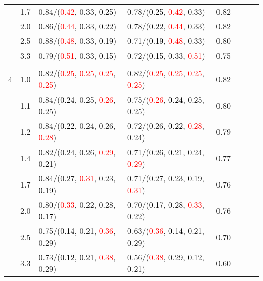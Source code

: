 \documentclass[10pt,a4paper]{report}
\begin{document}
\begin{table}[!htbp]
\begin{center}
{\begin{tabular}{ccllcccc}
			&1.7&0.84/(\textcolor{red}{0.42}, 0.33, \textcolor{black}{0.25})&0.78/(\textcolor{black}{0.25}, \textcolor{red}{0.42}, 0.33)&0.82\\
			&2.0&0.86/(\textcolor{red}{0.44}, 0.33, \textcolor{black}{0.22})&0.78/(\textcolor{black}{0.22}, \textcolor{red}{0.44}, 0.33)&0.82\\
			&2.5&0.88/(\textcolor{red}{0.48}, 0.33, \textcolor{black}{0.19})&0.71/(\textcolor{black}{0.19}, \textcolor{red}{0.48}, 0.33)&0.80\\
			&3.3&0.79/(\textcolor{red}{0.51}, 0.33, \textcolor{black}{0.15})&0.72/(\textcolor{black}{0.15}, 0.33, \textcolor{red}{0.51})&0.75\\
			&&&&\\
			4			&1.0&0.82/(\textcolor{red}{0.25}, \textcolor{red}{0.25}, \textcolor{red}{0.25}, \textcolor{red}{0.25})&0.82/(\textcolor{red}{0.25}, \textcolor{red}{0.25}, \textcolor{red}{0.25}, \textcolor{red}{0.25})&0.82\\
			&1.1&0.84/(\textcolor{black}{0.24}, 0.25, \textcolor{red}{0.26}, 0.25)&0.75/(\textcolor{red}{0.26}, \textcolor{black}{0.24}, 0.25, 0.25)&0.80\\
			&1.2&0.84/(\textcolor{black}{0.22}, 0.24, 0.26, \textcolor{red}{0.28})&0.72/(0.26, \textcolor{black}{0.22}, \textcolor{red}{0.28}, 0.24)&0.79\\
			&1.4&0.82/(0.24, 0.26, \textcolor{red}{0.29}, \textcolor{black}{0.21})&0.71/(0.26, \textcolor{black}{0.21}, 0.24, \textcolor{red}{0.29})&0.77\\
			&1.7&0.84/(0.27, \textcolor{red}{0.31}, 0.23, \textcolor{black}{0.19})&0.71/(0.27, 0.23, \textcolor{black}{0.19}, \textcolor{red}{0.31})&0.76\\
			&2.0&0.80/(\textcolor{red}{0.33}, 0.22, 0.28, \textcolor{black}{0.17})&0.70/(\textcolor{black}{0.17}, 0.28, \textcolor{red}{0.33}, 0.22)&0.76\\
			&2.5&0.75/(\textcolor{black}{0.14}, 0.21, \textcolor{red}{0.36}, 0.29)&0.63/(\textcolor{red}{0.36}, \textcolor{black}{0.14}, 0.21, 0.29)&0.70\\
			&3.3&0.73/(\textcolor{black}{0.12}, 0.21, \textcolor{red}{0.38}, 0.29)&0.56/(\textcolor{red}{0.38}, 0.29, \textcolor{black}{0.12}, 0.21)&0.60\\
			\bottomrule
		\end{tabular}}
	\end{center}
\end{table}
\end{document}
